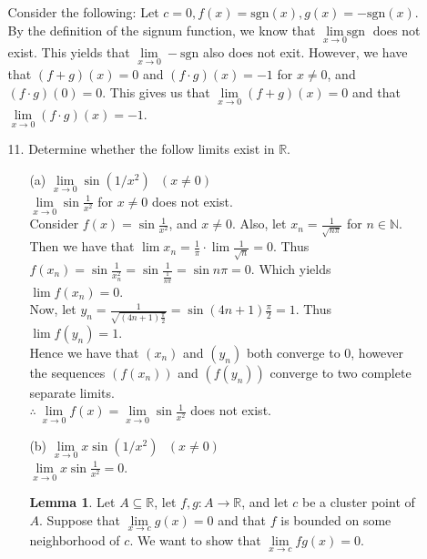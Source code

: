 \documentclass[12pt,letterpaper]{article}
\newcommand{\R}{\mathbb{R}}
\newcommand{\N}{\mathbb{N}}
\newcommand{\sgn}{\text{sgn}}
\theoremstyle{case}
\theoremstyle{definition}
\newtheorem{lemma}[theorem]{Lemma}
\begin{document}
\begin{enumerate}
\begin{enumerate}
			Consider the following: Let $c=0, f(x)=\sgn (x), g(x)=-\sgn(x)$. By the definition of the signum function, we know that $\lim\limits_{x \to 0} \sgn$ does not exist. This yields that $\lim\limits_{x \to 0} -\sgn$ also does not exit. However, we have that $(f+g)(x)=0$ and $(f \cdot g)(x)=-1$ for $x\neq 0$, and $(f \cdot g)(0)=0$. This gives us that $\lim\limits_{x \to 0} (f+g)(x)=0$ and that $\lim\limits_{x \to 0} (f \cdot g)(x) = -1$.\\
			
			\item[11.] Determine whether the follow limits exist in $\R$.
				\begin{enumerate}
					\item[(a)] $\lim\limits_{x \to 0} \sin (1/x^2)\ \ \ (x \neq 0)$\\
					
					$\lim\limits_{x \to 0} \sin \frac{1}{x^2}$ for $x \neq 0$ does not exist.\\
					
					Consider $f(x) = \sin \frac{1}{x^2}$, and $x \neq 0$. Also, let $x_n = \frac{1}{\sqrt{n\pi}}$ for $n \in \N$. Then we have that $\lim x_n = \frac{1}{\pi}\cdot \lim \frac{1}{\sqrt{n}}=0$. Thus $f(x_n) = \sin \frac{1}{x_n^2}=\sin \frac{1}{\frac{1}{n\pi}}=\sin n \pi = 0$. Which yields $\lim f(x_n)=0$.\\
					
					Now, let $y_n = \frac{1}{\sqrt{(4n+1)\frac{\pi}{2}}}=\sin (4n+1)\frac{\pi}{2}=1$. Thus $\lim f(y_n)=1$.\\
					
					Hence we have that $(x_n)$ and $(y_n)$ both converge to $0$, however the sequences $(f(x_n))$ and $(f(y_n))$ converge to two complete separate limits.\\
					
					$\therefore\ \lim\limits_{x \to 0} f(x) = \lim\limits_{x \to 0} \sin \frac{1}{x^2}$ does not exist.\\
					
					\item[(b)] $\lim\limits_{x \to 0} x \sin (1/x^2)\ \ \ (x \neq 0)$\\
					
					$\lim\limits_{x \to 0} x \sin \frac{1}{x^2}=0$.\\
					
					\begin{lemma}
						Let $A \subseteq \R$, let $f,g:A \to \R$, and let $c$ be a cluster point of $A$. Suppose that $\lim\limits_{x \to c} g(x)=0$ and that $f$ is bounded on some neighborhood of $c$. We want to show that $\lim\limits_{x \to c}fg(x)=0$.\\
						

\end{lemma}
\end{enumerate}
\end{enumerate}
\end{enumerate}
\end{document}
